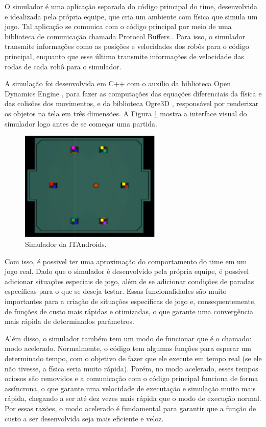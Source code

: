 \documentclass[a4paper,12pt]{article}
\begin{document}
O simulador é uma aplicação separada do código principal do time, desenvolvida e idealizada pela própria equipe, que cria um ambiente com física que simula um jogo. Tal aplicação se comunica com o código principal por meio de uma biblioteca de comunicação chamada Protocol Buffers \cite{protobuf}. Para isso, o simulador transmite informações como as posições e velocidades dos robôs para o código principal, enquanto que esse último transmite informações de velocidade das rodas de cada robô para o simulador.

A simulação foi desenvolvida em C++ com o auxílio da biblioteca Open Dynamics Engine \cite{ODE}, para fazer as computações das equações diferenciais da física e das colisões dos movimentos, e da biblioteca Ogre3D \cite{Ogre}, responsável por renderizar os objetos na tela em três dimensões. A Figura \ref{fig:simulator} mostra a interface visual do simulador logo antes de se começar uma partida.

\begin{figure}[H]
	\centering
	\includegraphics[width=0.6\textwidth]{figures/SimulatorWithoutButtons.png}
	\caption{Simulador da ITAndroids.}
	\label{fig:simulator}
\end{figure}


Com isso, é possivel ter uma aproximação do comportamento do time em um jogo real. Dado que o simulador é desenvolvido pela própria equipe, é possível adicionar situações especiais de jogo, além de se adicionar condições de paradas específicas para o que se deseja testar. Essas funcionalidades são muito importantes para a criação de situações específicas de jogo e, consequentemente, de funções de custo mais rápidas e otimizadas, o que garante uma convergência mais rápida de determinados parâmetros.

Além disso, o simulador também tem um modo de funcionar que é o chamado: modo acelerado. Normalmente, o código tem algumas funções para esperar um determinado tempo, com o objetivo de fazer que ele execute em tempo real (se ele não tivesse, a física seria muito rápida). Porém, no modo acelerado, esses tempos ociosos são removidos e a comunicação com o código principal funciona de forma assíncrona, o que garante uma velocidade de executação e simulação muito mais rápida, chegando a ser até dez vezes mais rápida que o modo de execução normal. Por essas razões, o modo acelerado é fundamental para garantir que a função de custo a ser desenvolvida seja mais eficiente e veloz.
\end{document}
